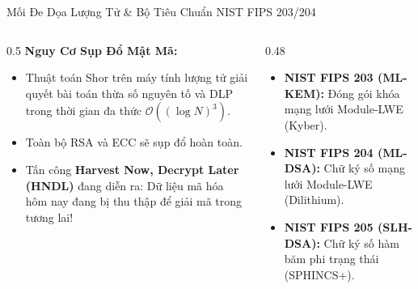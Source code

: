 \begin{frame}{Mối Đe Dọa Lượng Tử \& Bộ Tiêu Chuẩn NIST FIPS 203/204}
  \begin{columns}[T]
    \begin{column}{0.5\textwidth}
      \textbf{Nguy Cơ Sụp Đổ Mật Mã:}
      \begin{itemize}\small
        \item Thuật toán Shor trên máy tính lượng tử giải quyết bài toán thừa số nguyên tố và DLP trong thời gian đa thức $\mathcal{O}((\log N)^3)$.
        \item Toàn bộ RSA và ECC sẽ sụp đổ hoàn toàn.
        \item Tấn công \textbf{Harvest Now, Decrypt Later (HNDL)} đang diễn ra: Dữ liệu mã hóa hôm nay đang bị thu thập để giải mã trong tương lai!
      \end{itemize}
    \end{column}
    \begin{column}{0.48\textwidth}
      \begin{pqcbox}
        \begin{itemize}\small
          \item \textbf{NIST FIPS 203 (ML-KEM):} Đóng gói khóa mạng lưới Module-LWE (Kyber).
          \item \textbf{NIST FIPS 204 (ML-DSA):} Chữ ký số mạng lưới Module-LWE (Dilithium).
          \item \textbf{NIST FIPS 205 (SLH-DSA):} Chữ ký số hàm băm phi trạng thái (SPHINCS+).
        \end{itemize}
      \end{pqcbox}
    \end{column}
  \end{columns}
\end{frame}


